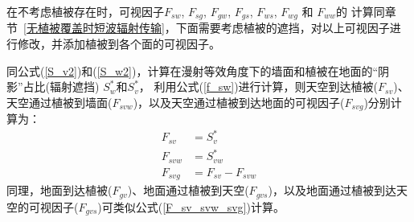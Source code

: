 在不考虑植被存在时，可视因子$F_{sw}$, $F_{sg}$, $F_{gw}$, $F_{gs}$, $F_{ws}$, $F_{wg}$ 和 $F_{ww}$的
计算同章节~\ref{无植被覆盖时短波辐射传输}，下面需要考虑植被的遮挡，对以上可视因子进行修改，并添加植被到各个面的可视因子。

同公式(\ref{S_v2})和(\ref{S_w2})，计算在漫射等效角度下的墙面和植被在地面的“阴影”占比(辐射遮挡) $S_w^\ast$和$S_v^\ast$，
利用公式(\ref{f_sw})进行计算，则天空到达植被($F_{sv}$)、天空通过植被到墙面($F_{svw}$)，以及天空通过植被到达地面的可视因子($F_{svg}$)分别计算为：
\begin{equation}\label{F_sv_svw_svg}
\begin{aligned}F_{s v} &=S_{v}^{*} \\ F_{s v w} &=S_{v w}^{*} \\ F_{s v g} &=F_{s v}-F_{s v w}\end{aligned}
\end{equation}
同理，地面到达植被($F_{gv}$)、地面通过植被到天空($F_{gvs}$)，以及地面通过植被到达天空的可视因子($F_{gvs}$)可类似公式(\ref{F_sv_svw_svg})计算。

